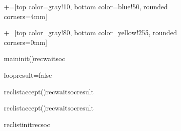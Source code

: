 \documentclass{article}
\begin{document}
	
		
\begin{figure}
	\centering
	
	
	\begin{sequencediagram}[.9]
		+=[top color=gray!10, bottom color=blue!50, rounded corners=4mm]
		
		+=[top color=gray!80, bottom color=yellow!255, rounded corners=0mm] 
		
		
		\begin{messcall}{main}{init()}{recwaitsoc}{}		
		\end{messcall}		
		\begin{sdblock}{loop}{result=false}
			\begin{call}{reclist}{accept()}{recwaitsoc}{result}
			\end{call}
		\end{sdblock}
		\begin{call}{reclist}{accept()}{recwaitsoc}{result}
			\begin{call}{reclist}{init}{recsoc}{}
			\end{call}			
		\end{call}		

		
		
		

	\end{sequencediagram}

\end{figure}	
	
\newpage
\clearpage
\end{document}
